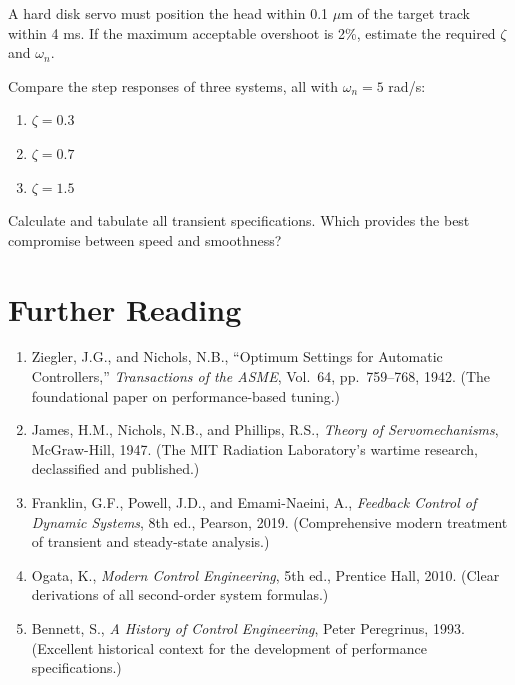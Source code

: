 \begin{exercise}
A hard disk servo must position the head within 0.1 $\mu$m of the target track within 4 ms. If the maximum acceptable overshoot is 2\%, estimate the required $\zeta$ and $\omega_n$.
\end{exercise}

\begin{exercise}
Compare the step responses of three systems, all with $\omega_n = 5$ rad/s:
\begin{enumerate}
    \item $\zeta = 0.3$
    \item $\zeta = 0.7$
    \item $\zeta = 1.5$
\end{enumerate}
Calculate and tabulate all transient specifications. Which provides the best compromise between speed and smoothness?
\end{exercise}

\section*{Further Reading}

\begin{enumerate}
    \item Ziegler, J.G., and Nichols, N.B., ``Optimum Settings for Automatic Controllers,'' \textit{Transactions of the ASME}, Vol.\ 64, pp.\ 759--768, 1942. (The foundational paper on performance-based tuning.)

    \item James, H.M., Nichols, N.B., and Phillips, R.S., \textit{Theory of Servomechanisms}, McGraw-Hill, 1947. (The MIT Radiation Laboratory's wartime research, declassified and published.)

    \item Franklin, G.F., Powell, J.D., and Emami-Naeini, A., \textit{Feedback Control of Dynamic Systems}, 8th ed., Pearson, 2019. (Comprehensive modern treatment of transient and steady-state analysis.)

    \item Ogata, K., \textit{Modern Control Engineering}, 5th ed., Prentice Hall, 2010. (Clear derivations of all second-order system formulas.)

    \item Bennett, S., \textit{A History of Control Engineering}, Peter Peregrinus, 1993. (Excellent historical context for the development of performance specifications.)
\end{enumerate}

